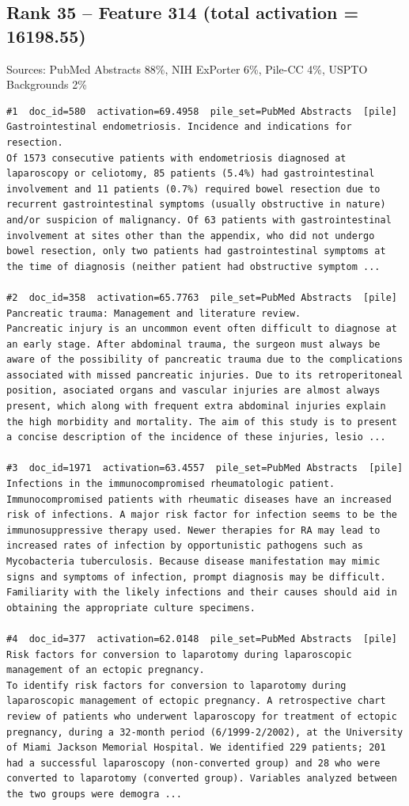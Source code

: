 \subsection*{Rank 35 -- Feature 314 (total activation = 16198.55)}

Sources: PubMed Abstracts 88\%, NIH ExPorter 6\%, Pile-CC 4\%, USPTO Backgrounds 2\%

\begin{verbatim}
#1  doc_id=580  activation=69.4958  pile_set=PubMed Abstracts  [pile]
Gastrointestinal endometriosis. Incidence and indications for resection.
Of 1573 consecutive patients with endometriosis diagnosed at laparoscopy or celiotomy, 85 patients (5.4%) had gastrointestinal involvement and 11 patients (0.7%) required bowel resection due to recurrent gastrointestinal symptoms (usually obstructive in nature) and/or suspicion of malignancy. Of 63 patients with gastrointestinal involvement at sites other than the appendix, who did not undergo bowel resection, only two patients had gastrointestinal symptoms at the time of diagnosis (neither patient had obstructive symptom ...

#2  doc_id=358  activation=65.7763  pile_set=PubMed Abstracts  [pile]
Pancreatic trauma: Management and literature review.
Pancreatic injury is an uncommon event often difficult to diagnose at an early stage. After abdominal trauma, the surgeon must always be aware of the possibility of pancreatic trauma due to the complications associated with missed pancreatic injuries. Due to its retroperitoneal position, asociated organs and vascular injuries are almost always present, which along with frequent extra abdominal injuries explain the high morbidity and mortality. The aim of this study is to present a concise description of the incidence of these injuries, lesio ...

#3  doc_id=1971  activation=63.4557  pile_set=PubMed Abstracts  [pile]
Infections in the immunocompromised rheumatologic patient.
Immunocompromised patients with rheumatic diseases have an increased risk of infections. A major risk factor for infection seems to be the immunosuppressive therapy used. Newer therapies for RA may lead to increased rates of infection by opportunistic pathogens such as Mycobacteria tuberculosis. Because disease manifestation may mimic signs and symptoms of infection, prompt diagnosis may be difficult. Familiarity with the likely infections and their causes should aid in obtaining the appropriate culture specimens.

#4  doc_id=377  activation=62.0148  pile_set=PubMed Abstracts  [pile]
Risk factors for conversion to laparotomy during laparoscopic management of an ectopic pregnancy.
To identify risk factors for conversion to laparotomy during laparoscopic management of ectopic pregnancy. A retrospective chart review of patients who underwent laparoscopy for treatment of ectopic pregnancy, during a 32-month period (6/1999-2/2002), at the University of Miami Jackson Memorial Hospital. We identified 229 patients; 201 had a successful laparoscopy (non-converted group) and 28 who were converted to laparotomy (converted group). Variables analyzed between the two groups were demogra ...


\end{verbatim}
